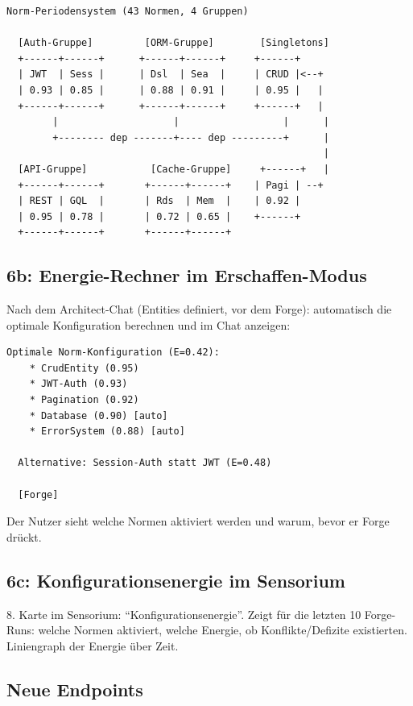 \documentclass[11pt,a4paper]{article}
\begin{document}
\begin{lstlisting}[style=bash]
  Norm-Periodensystem (43 Normen, 4 Gruppen)
  
  [Auth-Gruppe]         [ORM-Gruppe]        [Singletons]
  +------+------+      +------+------+     +------+
  | JWT  | Sess |      | Dsl  | Sea  |     | CRUD |<--+
  | 0.93 | 0.85 |      | 0.88 | 0.91 |     | 0.95 |   |
  +------+------+      +------+------+     +------+   |
        |                    |                  |      |
        +-------- dep -------+---- dep ---------+      |
                                                       |
  [API-Gruppe]           [Cache-Gruppe]     +------+   |
  +------+------+       +------+------+    | Pagi | --+
  | REST | GQL  |       | Rds  | Mem  |    | 0.92 |
  | 0.95 | 0.78 |       | 0.72 | 0.65 |    +------+
  +------+------+       +------+------+
\end{lstlisting}

\subsection{6b: Energie-Rechner im Erschaffen-Modus}

Nach dem Architect-Chat (Entities definiert, vor dem Forge): automatisch die optimale Konfiguration berechnen und im Chat anzeigen:

\begin{lstlisting}[style=bash]
  Optimale Norm-Konfiguration (E=0.42):
    * CrudEntity (0.95)
    * JWT-Auth (0.93)
    * Pagination (0.92)
    * Database (0.90) [auto]
    * ErrorSystem (0.88) [auto]
  
  Alternative: Session-Auth statt JWT (E=0.48)
  
  [Forge]
\end{lstlisting}

Der Nutzer sieht welche Normen aktiviert werden und warum, bevor er Forge dr\"uckt.

\subsection{6c: Konfigurationsenergie im Sensorium}

8. Karte im Sensorium: ``Konfigurationsenergie''. Zeigt f\"ur die letzten 10 Forge-Runs: welche Normen aktiviert, welche Energie, ob Konflikte/Defizite existierten. Liniengraph der Energie \"uber Zeit.

\subsection{Neue Endpoints}
\end{document}
